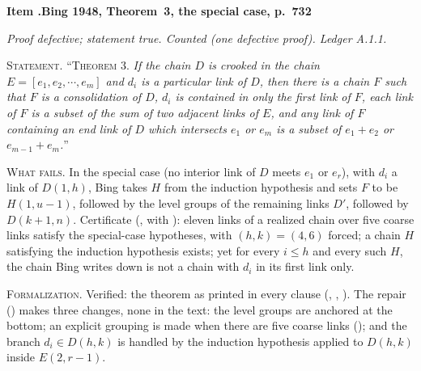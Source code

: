 \documentclass[11pt]{article}
\newcounter{defect}
\newenvironment{defect}[4]{%
  \par\addvspace{10pt}\refstepcounter{defect}%
  \noindent\textbf{Item \thedefect.\enspace #1}\par\nopagebreak
  \noindent\textit{#2}\par\nopagebreak\smallskip}{\par\addvspace{6pt}}
\newcommand{\fld}[1]{\par\noindent\textsc{#1.}\enspace}
\begin{document}
\begin{defect}{Bing 1948, Theorem~3, the special case, p.~732}{Proof defective; statement true.
Counted (one defective proof). Ledger A.1.1.}{0}{1}\label{it:b48-3}

\fld{Statement} ``\textsc{Theorem 3.} \emph{If the chain $D$ is crooked in the chain
$E=[e_1,e_2,\cdots,e_m]$ and $d_i$ is a particular link of $D$, then there is a chain $F$ such
that $F$ is a consolidation of $D$, $d_i$ is contained in only the first link of $F$, each link of
$F$ is a subset of the sum of two adjacent links of $E$, and any link of $F$ containing an end link
of $D$ which intersects $e_1$ or $e_m$ is a subset of $e_1+e_2$ or $e_{m-1}+e_m$.}''

\fld{What fails} In the special case (no interior link of $D$ meets $e_1$ or $e_r$), with $d_i$ a
link of $D(1,h)$, Bing takes $H$ from the induction hypothesis and sets $F$ to be $H(1,u-1)$,
followed by the level groups of the remaining links $D'$, followed by $D(k+1,n)$. Certificate
(, with ): eleven links of a
realized chain over five coarse links satisfy the special-case hypotheses, with $(h,k)=(4,6)$
forced; a chain $H$ satisfying the induction hypothesis exists; yet for every $i\le h$ and every
such $H$, the chain Bing writes down is not a chain with $d_i$ in its first link only.

\fld{Formalization} Verified: the theorem as printed in every clause
(, , ). The repair
() makes three changes, none in the text: the level groups are anchored
at the bottom; an explicit grouping is made when there are five coarse links
(); and the branch $d_i\in D(h,k)$ is handled by the induction
hypothesis applied to $D(h,k)$ inside $E(2,r-1)$.
\end{defect}
\end{document}
